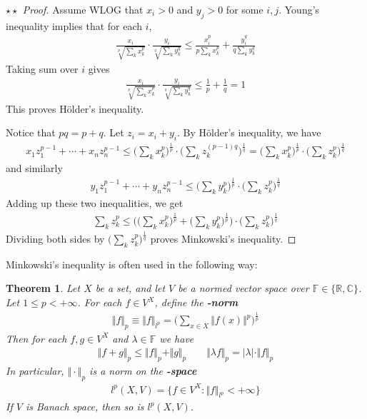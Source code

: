 \documentclass[12pt,b5paper,notitlepage]{article}
\theoremstyle{definition}
\theoremstyle{plain}
\newtheorem{thm}[df]{Theorem}
\newcommand{\Cbb}{\mathbb C}
\newcommand{\Rbb}{\mathbb R}
\newcommand{\Fbb}{\mathbb F}
\numberwithin{equation}{section}
\begin{document}
\begin{proof}[$\star\star$ Proof]
Assume WLOG that $x_i>0$ and $y_j>0$ for some $i,j$. Young's inequality implies that for each $i$,
\begin{align*}
\frac{x_i}{\sqrt[p]{\sum_k x_k^p}}\cdot \frac{y_i}{\sqrt[q]{\sum_k y_k^q}}\leq \frac{x_i^p}{p\sum_k x_k^p}+\frac{y_i^q}{q\sum_k y_k^q}
\end{align*}
Taking sum over $i$ gives
\begin{align*}
\frac{x_i}{\sqrt[p]{\sum_k x_k^p}}\cdot \frac{y_i}{\sqrt[q]{\sum_k y_k^q}}\leq\frac 1p+\frac 1q=1
\end{align*}
This proves H\"older's inequality.

Notice that $pq=p+q$. Let $z_i=x_i+y_i$. By H\"older's inequality, we have
\begin{align*}
x_1z_1^{p-1}+\cdots+x_nz_n^{p-1}\leq \Big(\sum_k x_k^p\Big)^{\frac 1p}\cdot\Big(\sum_k z_k^{(p-1)q}\Big)^{\frac 1q}=\Big(\sum_k x_k^p\Big)^{\frac 1p}\cdot\Big(\sum_k z_k^p\Big)^{\frac 1q}
\end{align*}
and similarly
\begin{align*}
y_1z_1^{p-1}+\cdots+y_nz_n^{p-1}\leq\Big(\sum_k y_k^p\Big)^{\frac 1p}\cdot\Big(\sum_k z_k^p\Big)^{\frac 1q}
\end{align*}
Adding up these two inequalities, we get
\begin{align*}
\sum_k z_k^p\leq \bigg(\Big(\sum_k x_k^p\Big)^{\frac 1p}+\Big(\sum_k y_k^p\Big)^{\frac 1p}\bigg)\cdot\Big(\sum_k z_k^p\Big)^{\frac 1q}
\end{align*}
Dividing both sides by $\Big(\sum_k z_k^p\Big)^{\frac 1q}$ proves Minkowski's inequality.
\end{proof}



Minkowski's inequality is often used in the following way:


\begin{thm}
Let $X$ be a set, and let $V$ be a normed vector space over $\Fbb\in\{\Rbb,\Cbb\}$. Let $1\leq p<+\infty$. For each $f\in V^X$, define the \textbf{-norm} 
\begin{align}
\Vert f\Vert_p\equiv\Vert f\Vert_{l^p}=\Big(\sum_{x\in X}\Vert f(x)\Vert^p\Big)^{\frac 1p}
\end{align}
Then for each $f,g\in V^X$ and $\lambda\in\Fbb$ we have
\begin{align}\label{eq148}
\Vert f+g\Vert_p\leq \Vert f\Vert_p+\Vert g\Vert_p\qquad \Vert \lambda f\Vert_p =|\lambda|\cdot \Vert f\Vert_p
\end{align}
In particular, $\Vert\cdot\Vert_p$ is a norm on the \textbf{-space}
\begin{align}
l^p(X,V)=\{f\in V^X:\Vert f\Vert_{l^p}<+\infty\}
\end{align}
If $V$ is Banach space, then so is $l^p(X,V)$.
\end{thm}
\end{document}
